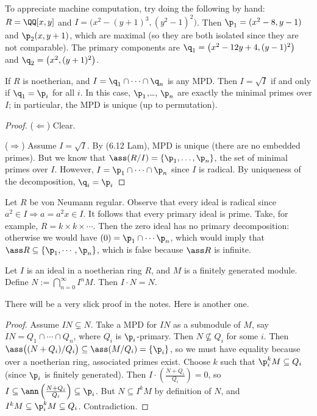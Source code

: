  \begin{example}
  To appreciate machine computation, try doing the following by hand: $R=\QQ[x,y]$ and
  $I=\bigl(x^2-(y+1)^3,(y^2-1)^2\bigr)$. Then $\p_1=(x^2-8,y-1)$ and $\p_2(x,y+1)$, which
  are maximal (so they are both isolated since they are not comparable). The primary
  components are $\q_1=\bigl(x^2-12y+4,(y-1)^2\bigr)$ and $\q_2=\bigl( x^2 ,
  (y+1)^2\bigr)$.
 \end{example}

 \begin{theorem}
   If $R$ is noetherian, and $I=\q_1\cap \cdots\cap \q_n$ is any MPD. Then $I=\sqrt I$ if
   and only if $\q_1=\p_i$ for all $i$. In this case, $\p_1$,\dots, $\p_n$ are exactly
   the minimal primes over $I$; in particular, the MPD is unique (up to permutation).
 \end{theorem}
 \begin{proof}
   ($\Leftarrow$) Clear.

   ($\Rightarrow$) Assume $I=\sqrt I$. By (6.12 Lam), MPD is unique (there are no
   embedded primes). But we know that $\ass(R/I)=\{\p_1,\dots, \p_n\}$, the set of
   minimal primes over $I$. However, $I=\p_1\cap\cdots \cap \p_n$ since $I$ is radical.
   By uniqueness of the decomposition, $\q_i=\p_i$
 \end{proof}
 \begin{remark}
   Let $R$ be von Neumann regular. Observe that every ideal is radical since $a^2\in
   I\Rightarrow a=a^2x\in I$. It follows that every primary ideal is prime. Take, for
   example, $R=k\times k\times \cdots$. Then the zero ideal has no primary decomposition:
   otherwise we would have $(0)=\p_1\cap \cdots \p_n$, which would imply that $\ass
   R\subseteq \{\p_1,\cdots, \p_n\}$, which is false because $\ass R$ is infinite.
 \end{remark}


 \begin{theorem}
   Let $I$ is an ideal in a noetherian ring $R$, and $M$ is a finitely generated module.
   Define $N:= \bigcap_{n=0}^\infty I^n M$. Then $I\cdot N=N$.
 \end{theorem}
 There will be a very slick proof in the notes. Here is another one.
 \begin{proof}
   Assume $IN\subsetneq N$. Take a MPD for $IN$ as a submodule of $M$, say $IN=Q_1\cap
   \cdots \cap Q_n$, where $Q_i$ is $\p_i$-primary. Then $N\not\subseteq Q_i$ for some
   $i$. Then $\ass\bigl( (N+Q_i)/Q_i\bigr)\subseteq \ass(M/Q_i)=\{\p_i\}$, so we must
   have equality because over a noetherian ring, associated primes exist. Choose $k$ such
   that $\p_i^k M\subseteq Q_i$ (since $\p_i$ is finitely generated). Then $I\cdot
   \left(\frac{N+Q_i}{Q_i}\right)=0$, so $I\subseteq \ann
   \left(\frac{N+Q_i}{Q_i}\right)\subseteq \p_i$. But $N\subseteq I^k M$ by definition of
   $N$, and $I^k M\subseteq \p_i^k M \subseteq Q_i$. Contradiction.
 \end{proof}
 \setcounter{lecture}{15}

